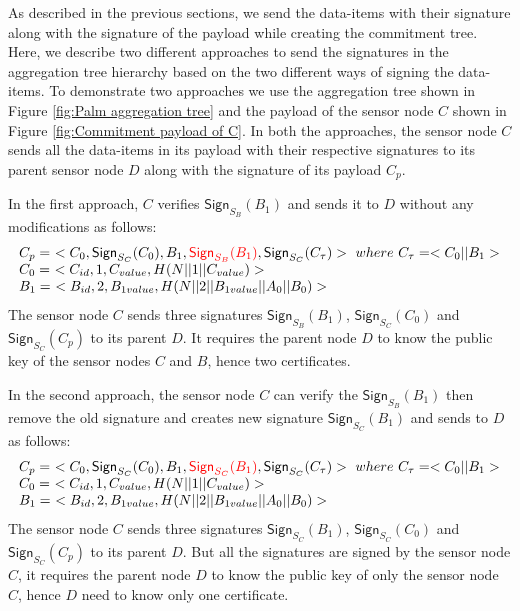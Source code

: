 	As described in the previous sections, we send the data-items with their signature along with the signature of the payload while creating the commitment tree.
	Here, we describe two different approaches to send the signatures in the aggregation tree hierarchy based on the two different ways of signing the data-items.
	To demonstrate two approaches we use the aggregation tree shown in Figure \ref{fig:Palm aggregation tree} and the payload of the sensor node $C$ shown in Figure \ref{fig:Commitment payload of C}.
	In both the approaches, the sensor node $C$ sends all the data-items in its payload with their respective signatures to its parent sensor node $D$ along with the signature of its payload $C_{p}$.

	In the first approach, $C$ verifies $\textsf{Sign}_{S_{B}}(B_{1})$ and sends it to $D$ without any modifications as follows:
	\begin{equation}	
		\begin{array}{l}
			C_{p} =\ <C_{0},\textsf{Sign}_{S_{C}}(C_{0}),B_{1},\textcolor{red}{\textsf{Sign}_{S_{B}}(B_{1})}, \textsf{Sign}_{S_{C}}(C_{\tau})>\ where\ C_{\tau} = <C_{0} || B_{1}>\\
			C_{0} =\ <C_{id}, 1, C_{value}, H(N||1||C_{value})>\\
			B_{1} =\ <B_{id}, 2, B_{1value}, H(N||2||B_{1value}||A_{0}||B_{0})>\\
		\end{array}
		\label{eq:forwarding-payload-without-resigning}
	\end{equation}
	The sensor node $C$ sends three signatures $\textsf{Sign}_{S_{B}}(B_{1})$, $\textsf{Sign}_{S_{C}}(C_{0}) $ and $\textsf{Sign}_{S_{C}}(C_{p})$ to its parent $D$.
	It requires the parent node $D$ to know the public key of the sensor nodes $C$ and $B$, hence two certificates.

	In the second approach, the sensor node $C$ can verify the $\textsf{Sign}_{S_{B}}(B_{1})$ then remove the old signature and creates new signature $\textsf{Sign}_{S_{C}}(B_{1})$ and sends to $D$ as follows:
	\begin{equation}	
		\begin{array}{l}
			C_{p} =\ <C_{0},\textsf{Sign}_{S_{C}}(C_{0}),B_{1},\textcolor{red}{\textsf{Sign}_{S_{C}}(B_{1})}, \textsf{Sign}_{S_{C}}(C_{\tau})>\ where\ C_{\tau} = <C_{0} || B_{1}>\\
			C_{0} =\ <C_{id}, 1, C_{value}, H(N||1||C_{value})>\\
			B_{1} =\ <B_{id}, 2, B_{1value}, H(N||2||B_{1value}||A_{0}||B_{0})>\\
		\end{array}
		\label{eq:forwarding-payload-with-resigning}
	\end{equation}
	The sensor node $C$ sends three signatures $\textsf{Sign}_{S_{C}}(B_{1})$, $\textsf{Sign}_{S_{C}}(C_{0}) $ and $\textsf{Sign}_{S_{C}}(C_{p})$ to its parent $D$.
	But all the signatures are signed by the sensor node $C$, it requires the parent node $D$ to know the public key of only the sensor node $C$, hence $D$ need to know only one certificate.

